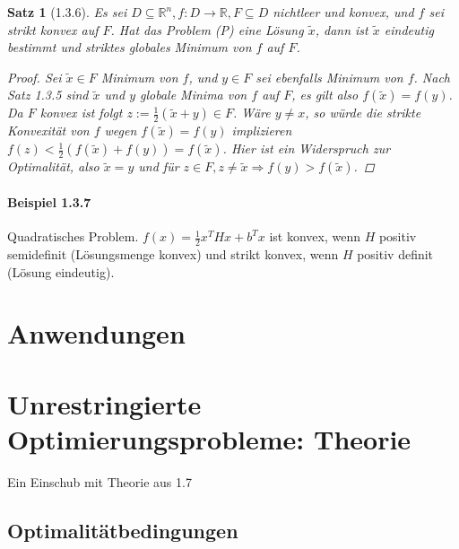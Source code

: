 \documentclass[ngerman,halfparskip]{scrartcl}
\newtheorem*{satz}{Satz}
\theoremstyle{definition}
\def\R{\mathbb R}
\begin{document}
\begin{satz}[1.3.6]
Es sei $D\subseteq\R^n, f:D\rightarrow \R, F\subseteq D$ nichtleer und konvex, und $f$ sei strikt konvex auf $F$. Hat das Problem (P) eine Lösung $\tilde x$, dann ist $\tilde x$ eindeutig bestimmt und striktes globales Minimum von $f$ auf $F$. 

\begin{proof}
Sei $\tilde x \in F$ Minimum von $f$, und $y\in F$ sei ebenfalls Minimum von $f$. Nach Satz 1.3.5 sind $\tilde x$ und $y$ globale Minima von $f$ auf $F$, es gilt also $f(\tilde x)=f(y)$. Da $F$ konvex ist folgt $z:=\frac 12 (\tilde x+y)\in F$. Wäre $y\neq x$, so würde die strikte Konvexität von $f$ wegen $f(\tilde x)=f(y)$ implizieren $f(z)<\frac 12 (f(\tilde x)+f(y))=f(\tilde x)$. Hier ist ein Widerspruch zur Optimalität, also $\tilde x = y$ und für $z\in F, z\neq \tilde x \Rightarrow f(y)>f(\tilde x)$.
\end{proof}
\end{satz}


\paragraph{Beispiel 1.3.7} Quadratisches Problem. $f(x)= \frac 12 x^THx+b^Tx$ ist konvex, wenn $H$ positiv semidefinit (Lösungsmenge konvex) und strikt konvex, wenn $H$ positiv definit (Lösung eindeutig).


\section{Anwendungen}
\section{Unrestringierte Optimierungsprobleme: Theorie}
Ein Einschub mit Theorie aus 1.7
\subsection*{Optimalitätbedingungen}
\end{document}
